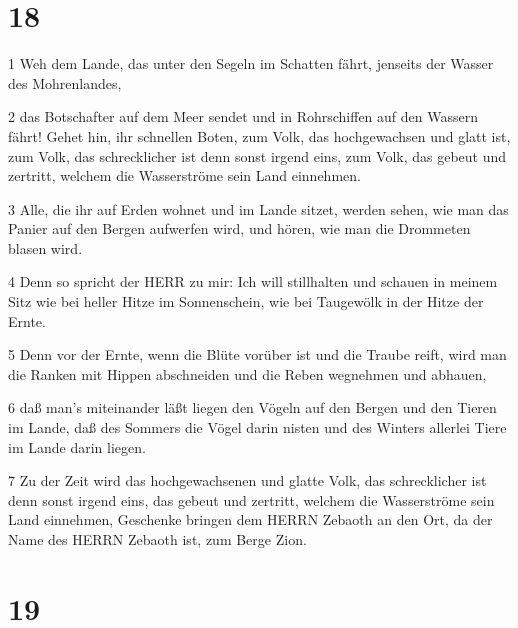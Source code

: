 \chapter{18}

\par 1 Weh dem Lande, das unter den Segeln im Schatten fährt, jenseits der Wasser des Mohrenlandes,
\par 2 das Botschafter auf dem Meer sendet und in Rohrschiffen auf den Wassern fährt! Gehet hin, ihr schnellen Boten, zum Volk, das hochgewachsen und glatt ist, zum Volk, das schrecklicher ist denn sonst irgend eins, zum Volk, das gebeut und zertritt, welchem die Wasserströme sein Land einnehmen.
\par 3 Alle, die ihr auf Erden wohnet und im Lande sitzet, werden sehen, wie man das Panier auf den Bergen aufwerfen wird, und hören, wie man die Drommeten blasen wird.
\par 4 Denn so spricht der HERR zu mir: Ich will stillhalten und schauen in meinem Sitz wie bei heller Hitze im Sonnenschein, wie bei Taugewölk in der Hitze der Ernte.
\par 5 Denn vor der Ernte, wenn die Blüte vorüber ist und die Traube reift, wird man die Ranken mit Hippen abschneiden und die Reben wegnehmen und abhauen,
\par 6 daß man's miteinander läßt liegen den Vögeln auf den Bergen und den Tieren im Lande, daß des Sommers die Vögel darin nisten und des Winters allerlei Tiere im Lande darin liegen.
\par 7 Zu der Zeit wird das hochgewachsenen und glatte Volk, das schrecklicher ist denn sonst irgend eins, das gebeut und zertritt, welchem die Wasserströme sein Land einnehmen, Geschenke bringen dem HERRN Zebaoth an den Ort, da der Name des HERRN Zebaoth ist, zum Berge Zion.

\chapter{19}

